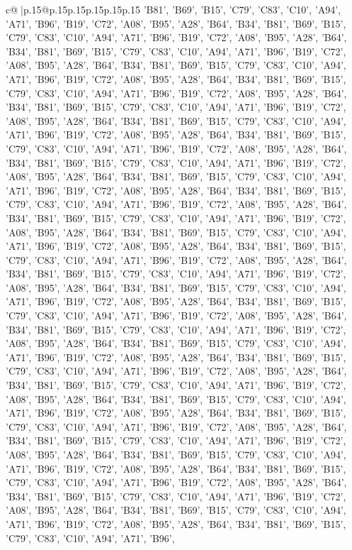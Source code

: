 \documentclass{article}
\begin{document}
{\begin{supertabular}{c@{$\;$}|p{.15\linewidth}@{}p{.15\linewidth}p{.15\linewidth}p{.15\linewidth}p{.15\linewidth}p{.15\linewidth}}
{{{{'B81', 'B69', 'B15', 'C79', 'C83', 'C10', 'A94', 'A71', 'B96', 'B19', 'C72', 'A08', 'B95', 'A28', 'B64', 'B34', 'B81', 'B69', 'B15', 'C79', 'C83', 'C10', 'A94', 'A71', 'B96', 'B19', 'C72', 'A08', 'B95', 'A28', 'B64', 'B34', 'B81', 'B69', 'B15', 'C79', 'C83', 'C10', 'A94', 'A71', 'B96', 'B19', 'C72', 'A08', 'B95', 'A28', 'B64', 'B34', 'B81', 'B69', 'B15', 'C79', 'C83', 'C10', 'A94', 'A71', 'B96', 'B19', 'C72', 'A08', 'B95', 'A28', 'B64', 'B34', 'B81', 'B69', 'B15', 'C79', 'C83', 'C10', 'A94', 'A71', 'B96', 'B19', 'C72', 'A08', 'B95', 'A28', 'B64', 'B34', 'B81', 'B69', 'B15', 'C79', 'C83', 'C10', 'A94', 'A71', 'B96', 'B19', 'C72', 'A08', 'B95', 'A28', 'B64', 'B34', 'B81', 'B69', 'B15', 'C79', 'C83', 'C10', 'A94', 'A71', 'B96', 'B19', 'C72', 'A08', 'B95', 'A28', 'B64', 'B34', 'B81', 'B69', 'B15', 'C79', 'C83', 'C10', 'A94', 'A71', 'B96', 'B19', 'C72', 'A08', 'B95', 'A28', 'B64', 'B34', 'B81', 'B69', 'B15', 'C79', 'C83', 'C10', 'A94', 'A71', 'B96', 'B19', 'C72', 'A08', 'B95', 'A28', 'B64', 'B34', 'B81', 'B69', 'B15', 'C79', 'C83', 'C10', 'A94', 'A71', 'B96', 'B19', 'C72', 'A08', 'B95', 'A28', 'B64', 'B34', 'B81', 'B69', 'B15', 'C79', 'C83', 'C10', 'A94', 'A71', 'B96', 'B19', 'C72', 'A08', 'B95', 'A28', 'B64', 'B34', 'B81', 'B69', 'B15', 'C79', 'C83', 'C10', 'A94', 'A71', 'B96', 'B19', 'C72', 'A08', 'B95', 'A28', 'B64', 'B34', 'B81', 'B69', 'B15', 'C79', 'C83', 'C10', 'A94', 'A71', 'B96', 'B19', 'C72', 'A08', 'B95', 'A28', 'B64', 'B34', 'B81', 'B69', 'B15', 'C79', 'C83', 'C10', 'A94', 'A71', 'B96', 'B19', 'C72', 'A08', 'B95', 'A28', 'B64', 'B34', 'B81', 'B69', 'B15', 'C79', 'C83', 'C10', 'A94', 'A71', 'B96', 'B19', 'C72', 'A08', 'B95', 'A28', 'B64', 'B34', 'B81', 'B69', 'B15', 'C79', 'C83', 'C10', 'A94', 'A71', 'B96', 'B19', 'C72', 'A08', 'B95', 'A28', 'B64', 'B34', 'B81', 'B69', 'B15', 'C79', 'C83', 'C10', 'A94', 'A71', 'B96', 'B19', 'C72', 'A08', 'B95', 'A28', 'B64', 'B34', 'B81', 'B69', 'B15', 'C79', 'C83', 'C10', 'A94', 'A71', 'B96', 'B19', 'C72', 'A08', 'B95', 'A28', 'B64', 'B34', 'B81', 'B69', 'B15', 'C79', 'C83', 'C10', 'A94', 'A71', 'B96', 'B19', 'C72', 'A08', 'B95', 'A28', 'B64', 'B34', 'B81', 'B69', 'B15', 'C79', 'C83', 'C10', 'A94', 'A71', 'B96', 'B19', 'C72', 'A08', 'B95', 'A28', 'B64', 'B34', 'B81', 'B69', 'B15', 'C79', 'C83', 'C10', 'A94', 'A71', 'B96', 'B19', 'C72', 'A08', 'B95', 'A28', 'B64', 'B34', 'B81', 'B69', 'B15', 'C79', 'C83', 'C10', 'A94', 'A71', 'B96', 'B19', 'C72', 'A08', 'B95', 'A28', 'B64', 'B34', 'B81', 'B69', 'B15', 'C79', 'C83', 'C10', 'A94', 'A71', 'B96', 'B19', 'C72', 'A08', 'B95', 'A28', 'B64', 'B34', 'B81', 'B69', 'B15', 'C79', 'C83', 'C10', 'A94', 'A71', 'B96', 'B19', 'C72', 'A08', 'B95', 'A28', 'B64', 'B34', 'B81', 'B69', 'B15', 'C79', 'C83', 'C10', 'A94', 'A71', 'B96', 'B19', 'C72', 'A08', 'B95', 'A28', 'B64', 'B34', 'B81', 'B69', 'B15', 'C79', 'C83', 'C10', 'A94', 'A71', 'B96', 'B19', 'C72', 'A08', 'B95', 'A28', 'B64', 'B34', 'B81', 'B69', 'B15', 'C79', 'C83', 'C10', 'A94', 'A71', 'B96', 'B19', 'C72', 'A08', 'B95', 'A28', 'B64', 'B34', 'B81', 'B69', 'B15', 'C79', 'C83', 'C10', 'A94', 'A71', 'B96', 'B19', 'C72', 'A08', 'B95', 'A28', 'B64', 'B34', 'B81', 'B69', 'B15', 'C79', 'C83', 'C10', 'A94', 'A71', 'B96', }}}}
\end{supertabular}}
\end{document}
